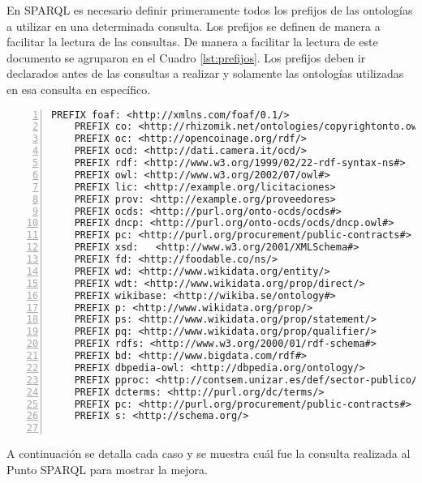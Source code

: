 En SPARQL es necesario definir primeramente todos los prefijos de las ontologías a utilizar en una determinada consulta. Los prefijos se definen de manera a facilitar la lectura de las consultas. De manera a facilitar la lectura de este documento se agruparon en el Cuadro \ref{lst:prefijos}. Los prefijos deben ir declarados antes de las consultas a realizar y solamente las ontologías utilizadas en esa consulta en específico.



\noindent\begin{minipage}[t]{\textwidth}
\begin{lstlisting}[captionpos=b, caption={Prefijos de las consultas SPARQL}, label={lst:prefijos},  numbers=left,  numberstyle=\tiny\color{mygray},frame=single]
    PREFIX foaf: <http://xmlns.com/foaf/0.1/>
    PREFIX co: <http://rhizomik.net/ontologies/copyrightonto.owl#>
    PREFIX oc: <http://opencoinage.org/rdf/>
    PREFIX ocd: <http://dati.camera.it/ocd/>
    PREFIX rdf: <http://www.w3.org/1999/02/22-rdf-syntax-ns#>
    PREFIX owl: <http://www.w3.org/2002/07/owl#>
    PREFIX lic: <http://example.org/licitaciones>
    PREFIX prov: <http://example.org/proveedores>
    PREFIX ocds: <http://purl.org/onto-ocds/ocds#>
    PREFIX dncp: <http://purl.org/onto-ocds/ocds/dncp.owl#>
    PREFIX pc: <http://purl.org/procurement/public-contracts#>
    PREFIX xsd:   <http://www.w3.org/2001/XMLSchema#>
    PREFIX fd: <http://foodable.co/ns/>
    PREFIX wd: <http://www.wikidata.org/entity/>
    PREFIX wdt: <http://www.wikidata.org/prop/direct/>
    PREFIX wikibase: <http://wikiba.se/ontology#>
    PREFIX p: <http://www.wikidata.org/prop/>
    PREFIX ps: <http://www.wikidata.org/prop/statement/>
    PREFIX pq: <http://www.wikidata.org/prop/qualifier/>
    PREFIX rdfs: <http://www.w3.org/2000/01/rdf-schema#>
    PREFIX bd: <http://www.bigdata.com/rdf#>
    PREFIX dbpedia-owl: <http://dbpedia.org/ontology/>
    PREFIX pproc: <http://contsem.unizar.es/def/sector-publico/pproc#> 
    PREFIX dcterms: <http://purl.org/dc/terms/> 
    PREFIX pc: <http://purl.org/procurement/public-contracts#> 
    PREFIX s: <http://schema.org/> 
    
 \end{lstlisting}
\end{minipage}

 A continuación se detalla cada caso y  se muestra cuál fue la consulta realizada al Punto SPARQL para mostrar la mejora.








